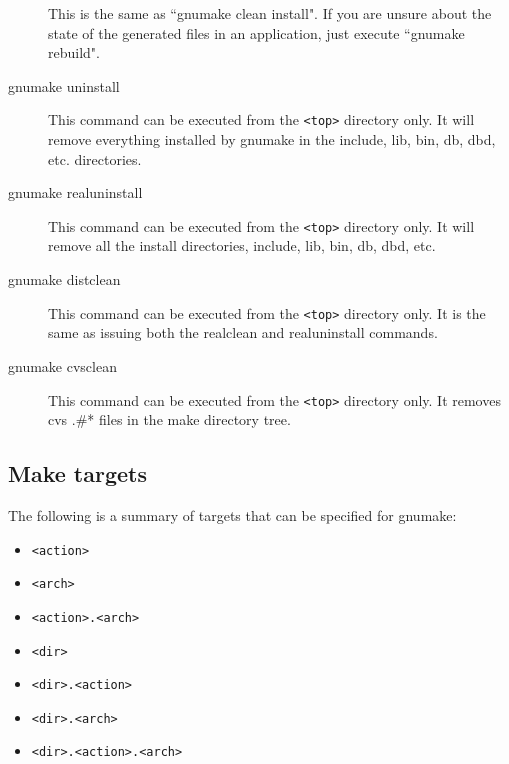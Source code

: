 \begin{description}
This is the same as ``gnumake clean install". If you are unsure about the state of the generated files in an application, just execute ``gnumake rebuild".

\item[gnumake uninstall]  

This command can be executed from the \verb|<top>| directory only. It will remove everything installed by gnumake in the include, lib, bin, db, dbd, etc. directories.

\item[gnumake realuninstall]  
This command can be executed from the \verb|<top>| directory only. It will remove all the install directories, include, lib, bin, db, dbd, etc.

\item[gnumake distclean]  

This command can be executed from the \verb|<top>| directory only. It is the same as issuing both the realclean and 
realuninstall commands.

\item[gnumake cvsclean]  

This command can be executed from the \verb|<top>| directory only. It removes cvs .\#* files in the make directory tree.

\end{description}

\subsection{Make targets}

The following is a summary of targets that can be specified for gnumake: 

\begin{itemize}
\item \verb|<action>|

\item \verb|<arch>|

\item \verb|<action>.<arch>|

\item \verb|<dir>|

\item \verb|<dir>.<action>|

\item  \verb|<dir>.<arch>|

\item \verb|<dir>.<action>.<arch>|

\end{itemize}

